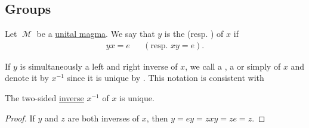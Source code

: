 \subsection{Groups}\label{subsec:groups}

\begin{definition}\label{def:unital_magma_inverse_element}
  Let \( \mscrM \) be a \hyperref[def:unital_magma]{unital magma}. We say that \( y \) is the  (resp. ) of \( x \) if
  \begin{align}\label{eq:def:unital_magma_inverse_element}
    yx = e
    &&
    (\text{resp. } xy = e).
  \end{align}

  If \( y \) is simultaneously a left and right inverse of \( x \), we call a , a  or simply  of \( x \) and denote it by \( x^{-1} \) since it is unique by . This notation is consistent with 
\end{definition}

\begin{proposition}\label{def:unital_magma_inverse_element_unique}
  The two-sided \hyperref[def:unital_magma_inverse_element]{inverse} \( x^{-1} \) of \( x \) is unique.
\end{proposition}
\begin{proof}
  If \( y \) and \( z \) are both inverses of \( x \), then \( y = ey = zxy = ze = z \).
\end{proof}

